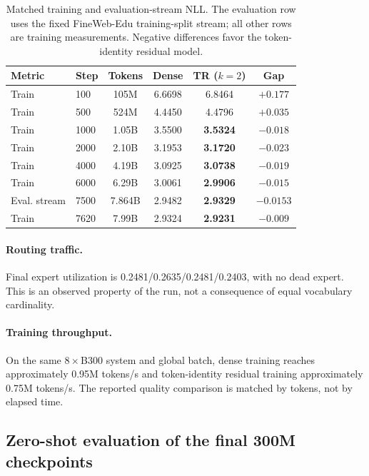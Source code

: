 \documentclass[10pt]{article}
\theoremstyle{definition}
\theoremstyle{remark}
\begin{document}
\begin{table}[H]
\centering
\small
\setlength{\tabcolsep}{4pt}
\caption{Matched training and evaluation-stream NLL. The evaluation row uses the fixed FineWeb-Edu training-split stream; all other rows are training measurements. Negative differences favor the token-identity residual model.}
\label{tab:scaling_300m_result}
\begin{tabular}{llcccc}
\toprule
\textbf{Metric} & \textbf{Step} & \textbf{Tokens} & \textbf{Dense} & \textbf{TR ($k=2$)} & \textbf{Gap} \\
\midrule
Train & 100  & 105M   & 6.6698 & 6.8464          & $+0.177$ \\
Train & 500  & 524M   & 4.4450 & 4.4796          & $+0.035$ \\
Train & 1000 & 1.05B  & 3.5500 & \textbf{3.5324} & $\mathbf{-0.018}$ \\
Train & 2000 & 2.10B  & 3.1953 & \textbf{3.1720} & $\mathbf{-0.023}$ \\
Train & 4000 & 4.19B  & 3.0925 & \textbf{3.0738} & $\mathbf{-0.019}$ \\
Train & 6000 & 6.29B  & 3.0061 & \textbf{2.9906} & $\mathbf{-0.015}$ \\
Eval. stream & 7500 & 7.864B & 2.9482 & \textbf{2.9329} & $\mathbf{-0.0153}$ \\
Train & 7620 & 7.99B  & 2.9324 & \textbf{2.9231} & $\mathbf{-0.009}$ \\
\bottomrule
\end{tabular}
\end{table}

\FloatBarrier

\paragraph{Routing traffic.} Final expert utilization is 0.2481/0.2635/0.2481/0.2403, with no dead expert. This is an observed property of the run, not a consequence of equal vocabulary cardinality.

\paragraph{Training throughput.} On the same $8\times$B300 system and global batch, dense training reaches approximately 0.95M tokens/s and token-identity residual training approximately 0.75M tokens/s. The reported quality comparison is matched by tokens, not by elapsed time.

\subsection{Zero-shot evaluation of the final 300M checkpoints}
\label{sec:benchmark_300m}
\end{document}
